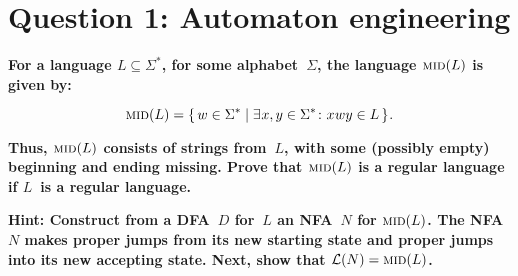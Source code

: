 \section*{Question 1: Automaton engineering}
    \textbf{For a language $L \subseteq \Sigma^\ast$, for some alphabet~$\Sigma$, the language $\textsc{mid}(L)$ is given by:}
    
    \begin{displaymath}
      \textsc{mid}(L) =
      \lbrace \, w \in \Sigma^\ast \mid
      \exists \mkern1mu x,y \in \Sigma^\ast \colon
      x \mkern0.5mu wy \in L
      \, \rbrace \mkern1mu .
    \end{displaymath}
    
    \textbf{Thus, $\textsc{mid}(L)$ consists of strings from~$L$, with some (possibly empty) beginning and ending missing. Prove that $\textsc{mid}(L)$ is a regular language if $L$~is a regular language.}
    
    \medskip
    
    \textbf{Hint: Construct from a DFA~$D$ for~$L$ an NFA~$N$ for $\textsc{mid}(L)$. The NFA $N$ makes proper jumps from its new starting state and proper jumps into its new accepting state. Next, show that $\mathcal{L}(N) = \textsc{mid}(L)$.}
    
